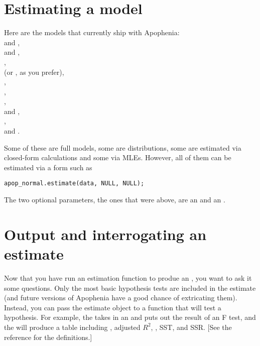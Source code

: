 \section{Estimating a model}
Here are the models that currently ship with Apophenia:\\
 and , \\
 and , \\
, \\
 (or , as you prefer), \\
, \\
, \\
, \\
 and , \\
, \\
 and .

Some of these are full models, some are distributions, some are
estimated via closed-form calculations and some via MLEs. However, all
of them can be estimated via a form such as
\begin{lstlisting}
apop_normal.estimate(data, NULL, NULL);
\end{lstlisting}

The two optional parameters, the ones that were  above,
are an  and an
.


\section{Output and interrogating an estimate}
Now that you have run an estimation function to produe an 
, you want to ask it some questions. Only the most
basic hypothesis tests are included in the estimate (and future versions
of Apophenia have a good chance of extricating them). Instead, you can
pass the estimate object to a function that will test a hypothesis. For
example, the  takes in an 
 and puts out the result of an F test, and the
 will produce a
table including , adjusted $R^2$, , SST, and SSR. [See the
reference for the definitions.]

